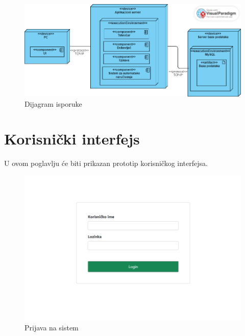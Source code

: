 \documentclass[a4paper]{article}
\begin{document}
\begin{figure}[H]
\begin{center}
\includegraphics[scale=0.6, width = 1\textwidth]{Dijagrami/Dijagrami_isporuke/Dijagram_isporuke.png}
\end{center}
\caption{Dijagram isporuke}
\label{fig:isporuka}
\end{figure}

\section{Korisnički interfejs}
U ovom poglavlju će biti prikazan prototip korisničkog interfejsa.

\begin{figure}[H]
\begin{center}
\includegraphics[scale=0.6]{UI/prijava.png}
\end{center}
\caption{Prijava na sistem}
\label{fig:ui_prijava}
\end{figure}
\end{document}
